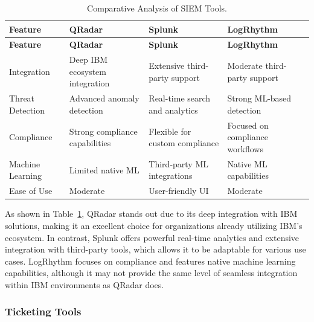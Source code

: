 \begin{longtable}{p{3cm}p{3cm}p{3cm}p{3cm}}
    \caption{Comparative Analysis of SIEM Tools.}
    \label{tab:siem_ca} \\
    \toprule
    \textbf{Feature} & \textbf{QRadar} & \textbf{Splunk} & \textbf{LogRhythm} \\
    \midrule
    \endfirsthead
    \toprule
    \textbf{Feature} & \textbf{QRadar} & \textbf{Splunk} & \textbf{LogRhythm} \\
    \midrule
    \endhead
    \bottomrule
    \endfoot
    \bottomrule
    \endlastfoot
    Integration & Deep IBM ecosystem integration & Extensive third-party support & Moderate third-party support \\
    Threat Detection & Advanced anomaly detection & Real-time search and analytics & Strong ML-based detection \\
    Compliance & Strong compliance capabilities & Flexible for custom compliance & Focused on compliance workflows \\
    Machine Learning & Limited native ML & Third-party ML integrations & Native ML capabilities \\
    Ease of Use & Moderate & User-friendly UI & Moderate \\
\end{longtable}

As shown in Table~\ref{tab:siem_ca}, QRadar stands out due to its deep integration with IBM solutions, making it an excellent choice for organizations already utilizing IBM's ecosystem. 
In contrast, Splunk offers powerful real-time analytics and extensive integration with third-party tools, which allows it to be adaptable for various use cases. 
LogRhythm focuses on compliance and features native machine learning capabilities, although it may not provide the same level of seamless integration within IBM environments as QRadar does.

\subsubsection{Ticketing Tools}

